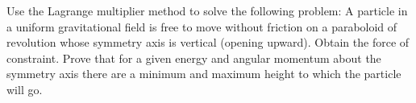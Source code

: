 \documentclass[../main.tex]{subfiles}
\begin{document}
\begin{problema}
	Use the Lagrange multiplier method to solve the following problem: A
	particle in a uniform gravitational field is free to move without
	friction on a paraboloid of revolution whose symmetry axis is vertical
	(opening upward). Obtain the force of constraint. Prove that for a
	given energy and angular momentum about the symmetry axis there are
	a minimum and maximum height to which the particle will go.
\end{problema}
\end{document}
